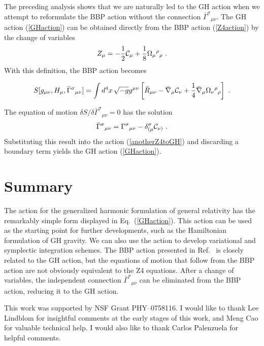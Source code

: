 \documentclass[letterpaper,nofootinbib,prd,amsmath,twocolumn]{revtex4-1}
\begin{document}
The preceding analysis shows that we are naturally led to the GH action when we attempt to reformulate 
the BBP action without the connection $\bar\Gamma^\sigma{}_{\mu\nu}$. The GH action (\ref{GHaction}) can 
be obtained directly from the BBP action (\ref{Z4action}) by the change of variables 
\begin{equation}
	Z_\mu = -\frac{1}{2} {\cal C}_\mu + \frac{1}{8} \Omega_\mu{}^\rho{}_\rho \ .
\end{equation}
With this definition, the BBP action becomes 
\begin{widetext}
\begin{equation}\label{anotherZ4toGH}
	S[g_{\mu\nu},H_\mu,\bar\Gamma^\sigma{}_{\mu\nu}] 
	= \int d^4x \, \sqrt{-g} g^{\mu\nu} \left[ \bar R_{\mu\nu} - \bar\nabla_\mu {\cal C}_\nu 
	+ \frac{1}{4} \bar\nabla_\mu \Omega_\nu{}^\rho{}_\rho \right] \ .
\end{equation}
\end{widetext}
The equation of motion $\delta S/\delta\bar\Gamma^\sigma{}_{\mu\nu} = 0$ has the solution 
\begin{equation}
	\bar\Gamma^\sigma{}_{\mu\nu} = \Gamma^\sigma{}_{\mu\nu} - \delta_{(\mu}^\sigma {\cal C}_{\nu)} \ .
\end{equation}
Substituting this result into the action (\ref{anotherZ4toGH}) and discarding a boundary term yields 
the GH action (\ref{GHaction}).

\section{Summary}\label{section5}
The action for the generalized harmonic formulation of general relativity has the remarkably simple form 
displayed in Eq.~(\ref{GHaction}). This action can be used as the starting point for further 
developments, such as the Hamiltonian formulation of GH gravity. We can also use the action to develop  
variational and symplectic integration schemes. The BBP action presented in 
Ref.~\cite{Bona:2010is} is closely related to the GH action, but the equations of motion that follow from 
the BBP action are not obviously equivalent to the Z4 equations. 
After a change of variables, the independent connection $\bar\Gamma^\sigma{}_{\mu\nu}$ can be 
eliminated from the BBP action, reducing it to the GH action.  

\begin{acknowledgments}
This work was supported by 
NSF Grant PHY--0758116. I would like to thank Lee Lindblom for insightful comments at the early 
stages of this work, and Meng Cao for valuable technical help. I would also like to thank 
Carlos Palenzuela for helpful comments. 
\end{acknowledgments}
\end{document}
